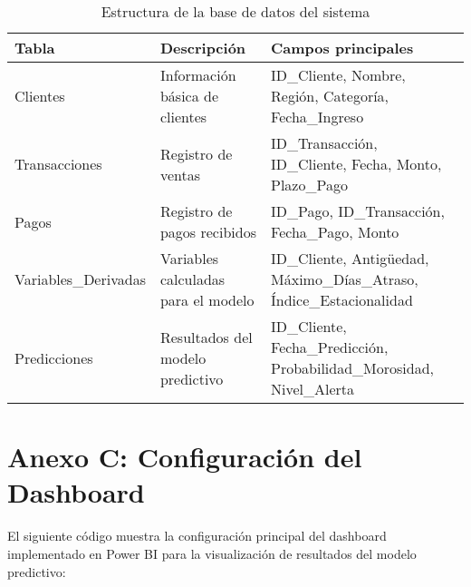\begin{table}[ht]
\centering
\begin{tabular}{|p{4cm}|p{3cm}|p{7cm}|}
\hline
\textbf{Tabla} & \textbf{Descripción} & \textbf{Campos principales} \\
\hline
Clientes & Información básica de clientes & ID\_Cliente, Nombre, Región, Categoría, Fecha\_Ingreso \\
\hline
Transacciones & Registro de ventas & ID\_Transacción, ID\_Cliente, Fecha, Monto, Plazo\_Pago \\
\hline
Pagos & Registro de pagos recibidos & ID\_Pago, ID\_Transacción, Fecha\_Pago, Monto \\
\hline
Variables\_Derivadas & Variables calculadas para el modelo & ID\_Cliente, Antigüedad, Máximo\_Días\_Atraso, Índice\_Estacionalidad \\
\hline
Predicciones & Resultados del modelo predictivo & ID\_Cliente, Fecha\_Predicción, Probabilidad\_Morosidad, Nivel\_Alerta \\
\hline
\end{tabular}
\caption{Estructura de la base de datos del sistema}
\label{tab:estructura_bd}
\end{table}
\section{Anexo C: Configuración del Dashboard}

El siguiente código muestra la configuración principal del dashboard implementado en Power BI para la visualización de resultados del modelo predictivo:

